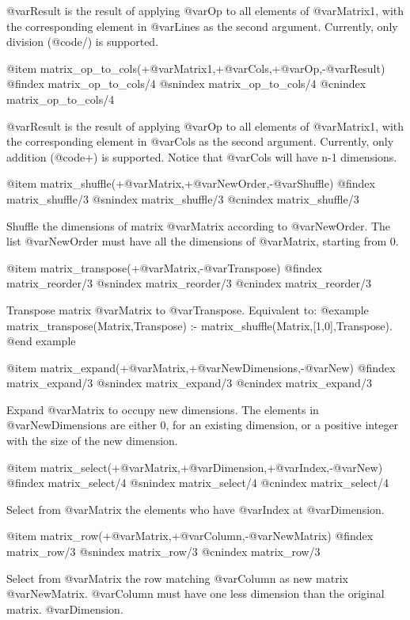 @var{Result} is the result of applying @var{Op} to all elements of
@var{Matrix1}, with the corresponding element in @var{Lines} as the
second argument. Currently, only division (@code{/}) is supported.

@item matrix_op_to_cols(+@var{Matrix1},+@var{Cols},+@var{Op},-@var{Result})
@findex matrix_op_to_cols/4
@snindex matrix_op_to_cols/4
@cnindex matrix_op_to_cols/4

@var{Result} is the result of applying @var{Op} to all elements of
@var{Matrix1}, with the corresponding element in @var{Cols} as the
second argument. Currently, only addition (@code{+}) is
supported. Notice that @var{Cols} will have n-1 dimensions.

@item matrix_shuffle(+@var{Matrix},+@var{NewOrder},-@var{Shuffle})
@findex matrix_shuffle/3
@snindex matrix_shuffle/3
@cnindex matrix_shuffle/3

Shuffle the dimensions of matrix @var{Matrix} according to
@var{NewOrder}. The list @var{NewOrder} must have all the dimensions of
@var{Matrix}, starting from 0.

@item matrix_transpose(+@var{Matrix},-@var{Transpose})
@findex matrix_reorder/3
@snindex matrix_reorder/3
@cnindex matrix_reorder/3

Transpose matrix @var{Matrix} to  @var{Transpose}. Equivalent to:
@example
matrix_transpose(Matrix,Transpose) :-
        matrix_shuffle(Matrix,[1,0],Transpose).
@end example

@item matrix_expand(+@var{Matrix},+@var{NewDimensions},-@var{New})
@findex matrix_expand/3
@snindex matrix_expand/3
@cnindex matrix_expand/3

Expand @var{Matrix} to occupy new dimensions. The elements in
@var{NewDimensions} are either 0, for an existing dimension, or a
positive integer with the size of the new dimension.

@item matrix_select(+@var{Matrix},+@var{Dimension},+@var{Index},-@var{New})
@findex matrix_select/4
@snindex matrix_select/4
@cnindex matrix_select/4

Select from @var{Matrix} the elements who have @var{Index} at
@var{Dimension}.

@item matrix_row(+@var{Matrix},+@var{Column},-@var{NewMatrix})
@findex matrix_row/3
@snindex matrix_row/3
@cnindex matrix_row/3

Select from @var{Matrix} the row matching @var{Column} as new matrix @var{NewMatrix}. @var{Column} must have one less dimension than the original matrix.
@var{Dimension}.

